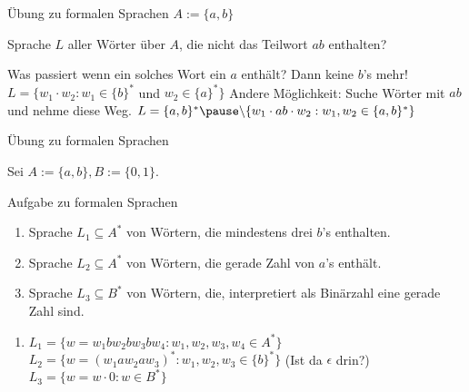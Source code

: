 \begin{frame}{Übung zu formalen Sprachen}
	$A := \{a, b\}$
	
	\begin{itemize}
		\pitem Sprache $L$ aller Wörter über $A$, die nicht das Teilwort $ab$ enthalten?
		\begin{itemize}
			\pitem Was passiert wenn ein solches Wort ein $a$ enthält? \pause Dann keine $b$'s mehr!
			\pitem $L = \{w_1 \cdot w_2 : w_1 \in \{b\}^*$ und $w_2 \in \{a\}^* \}$
			\pitem Andere Möglichkeit\pause : Suche Wörter mit $ab$ und nehme diese Weg.
			\pitem $L = \{a, b\}^*\pause \backslash\{ w_1 \cdot ab \cdot w_2 : w_1, w_2 \in \{a,b\}^* \}$
		\end{itemize}
	\end{itemize}
\end{frame}

\begin{frame}{Übung zu formalen Sprachen}
	
	Sei $A := \{a, b\}, B := \{0, 1\}$.
	
	\begin{taskblock}{Aufgabe zu formalen Sprachen}
		\begin{enumerate}
			\item Sprache $L_1 \subseteq A^*$ von Wörtern, die mindestens drei $b$'s enthalten.
			\item Sprache $L_2 \subseteq A^*$ von Wörtern, die gerade Zahl von $a$'s enthält.
			\item Sprache $L_3 \subseteq B^*$ von Wörtern, die, interpretiert als Binärzahl eine gerade Zahl sind.
		\end{enumerate}
	\end{taskblock}

	\pause
	
	\begin{enumerate}
		\item $L_1 = \{w = w_1  b  w_2  b  w_3 b w_4 : w_1,w_2,w_3,w_4 \in A^* \}$
		\pitem $L_2 = \{w = (w_1 a w_2 a w_3)^* : w_1,w_2,w_3 \in \{b\}^* \}$ \pause (Ist da $\epsilon$ drin?)
		\pitem $L_3 = \{w = w \cdot 0 : w \in B^* \}$
	\end{enumerate}
\end{frame}

